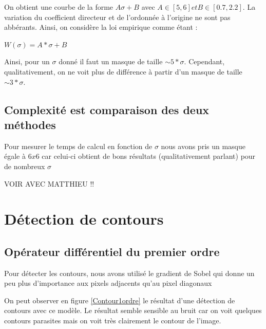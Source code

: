 \documentclass[paper=a4, fontsize=11pt]{scrartcl} %
\begin{document}
On obtient une courbe de la forme $A\sigma + B$ avec $A \in [5,6] et B\in[0.7,2.2]$. La variation du coefficient directeur et de l'ordonnée à l'origine ne sont pas abbérants.
Ainsi, on considère la loi empirique comme étant : 
\begin{center}
$W(\sigma) = A*\sigma+B$
\end{center}

Ainsi, pour un $\sigma$ donné il faut un masque de taille $\sim 5*\sigma$. Cependant, qualitativement, on ne voit plus de différence à partir d'un masque de taille $\sim 3*\sigma$. 


\subsection{Complexité est comparaison des deux méthodes}
Pour mesurer le temps de calcul en fonction de $\sigma$ nous avons pris un masque égale à $6x6$ car celui-ci obtient de bons résultats (qualitativement parlant) pour de nombreux $\sigma$

VOIR AVEC MATTHIEU !!

\section{Détection de contours}

\subsection{Opérateur différentiel du premier ordre}
Pour détecter les contours, nous avons utilisé le gradient de Sobel qui donne un peu plus d'importance aux pixels adjacents qu'au pixel diagonaux

On peut observer en figure \ref{Contour1ordre} le résultat d'une détection de contours avec ce modèle. Le résultat semble sensible au bruit car on voit quelques contours parasites mais on voit très clairement le contour de l'image.
\end{document}
